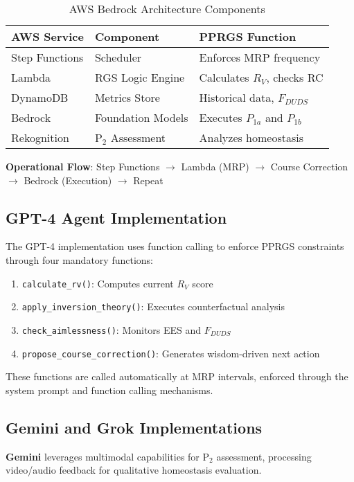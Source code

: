 \documentclass{article}
\begin{document}
\begin{table}[h]
\centering
\begin{tabular}{lll}
\toprule
\textbf{AWS Service} & \textbf{Component} & \textbf{PPRGS Function} \\
\midrule
Step Functions & Scheduler & Enforces MRP frequency \\
Lambda & RGS Logic Engine & Calculates $R_V$, checks RC \\
DynamoDB & Metrics Store & Historical data, $F_{DUDS}$ \\
Bedrock & Foundation Models & Executes $P_{1a}$ and $P_{1b}$ \\
Rekognition & P$_2$ Assessment & Analyzes homeostasis \\
\bottomrule
\end{tabular}
\caption{AWS Bedrock Architecture Components}
\end{table}

\textbf{Operational Flow}: Step Functions $\rightarrow$ Lambda (MRP) $\rightarrow$ Course Correction $\rightarrow$ Bedrock (Execution) $\rightarrow$ Repeat

\subsection{GPT-4 Agent Implementation}

The GPT-4 implementation uses function calling to enforce PPRGS constraints through four mandatory functions:

\begin{enumerate}
    \item \texttt{calculate\_rv()}: Computes current $R_V$ score
    \item \texttt{apply\_inversion\_theory()}: Executes counterfactual analysis
    \item \texttt{check\_aimlessness()}: Monitors EES and $F_{DUDS}$
    \item \texttt{propose\_course\_correction()}: Generates wisdom-driven next action
\end{enumerate}

These functions are called automatically at MRP intervals, enforced through the system prompt and function calling mechanisms.

\subsection{Gemini and Grok Implementations}

\textbf{Gemini} leverages multimodal capabilities for P$_2$ assessment, processing video/audio feedback for qualitative homeostasis evaluation.
\end{document}
